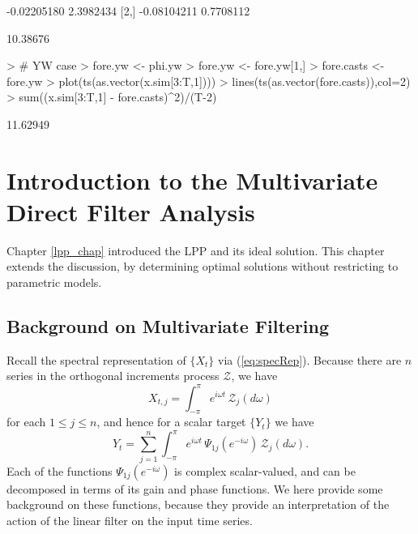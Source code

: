 \documentclass[a4paper]{book}
\begin{document}
\begin{Schunk}
\begin{Soutput}
            [,1]      [,2]
[1,] -0.02205180 2.3982434
[2,] -0.08104211 0.7708112
\end{Soutput}
\begin{Soutput}
[1] 10.38676
\end{Soutput}
\begin{Sinput}
> # YW case
> fore.yw <- phi.yw %
> fore.yw <- fore.yw[1,]
> fore.casts <- fore.yw %
> plot(ts(as.vector(x.sim[3:T,1])))
> lines(ts(as.vector(fore.casts)),col=2)
> sum((x.sim[3:T,1] - fore.casts)^2)/(T-2)
\end{Sinput}
\begin{Soutput}
[1] 11.62949
\end{Soutput}
\end{Schunk}




\chapter{Introduction to the Multivariate Direct Filter Analysis}

Chapter \ref{lpp_chap} introduced the LPP and its ideal solution.  This chapter
 extends the discussion, by determining optimal solutions without restricting
 to parametric models.

\section{Background on Multivariate Filtering}

 Recall the spectral representation of $\{ X_t \}$ via (\ref{eq:specRep}).  Because 
 there are $n$ series in the orthogonal increments process $\mathcal{Z}$, we have
\[
  X_{t,j} = \int_{-\pi}^{\pi} e^{i \omega t} \, \mathcal{Z}_j (d\omega )
\] 
 for each $1 \leq j \leq n$, and hence for a scalar target $\{ Y_t \}$ we have
\begin{equation}
 \label{eq:spec-rep.partial}
  Y_t = \sum_{j=1}^n  \int_{-\pi}^{\pi} e^{i \omega  t} \, \Psi_{1 j} (e^{-i \omega }) \,
   \mathcal{Z}_j (d\omega ).
\end{equation}
  Each of the functions $\Psi_{1j} (e^{-i \omega })$ is complex scalar-valued, and
 can be decomposed in terms of its gain and phase functions.   We here provide some
 background on these functions, because they provide an interpretation of the action
 of the linear filter on the input time series.
\end{document}
